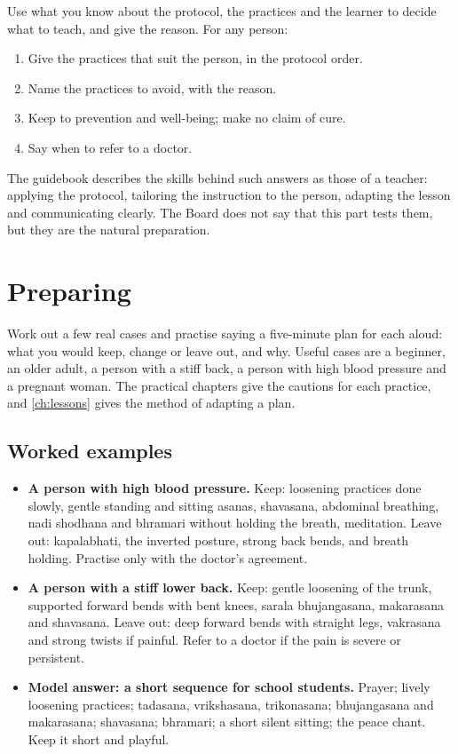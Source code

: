 Use what you know about the protocol, the practices and the learner to decide what to teach, and give the reason. For any person:
\begin{enumerate}
\item Give the practices that suit the person, in the protocol order.
\item Name the practices to avoid, with the reason.
\item Keep to prevention and well-being; make no claim of cure.
\item Say when to refer to a doctor.
\end{enumerate}
The guidebook describes the skills behind such answers as those of a teacher: applying the protocol, tailoring the instruction to the person, adapting the lesson and communicating clearly. The Board does not say that this part tests them, but they are the natural preparation.


\section{Preparing}

Work out a few real cases and practise saying a five-minute plan for each aloud: what you would keep, change or leave out, and why. Useful cases are a beginner, an older adult, a person with a stiff back, a person with high blood pressure and a pregnant woman. The practical chapters give the cautions for each practice, and \cref{ch:lessons} gives the method of adapting a plan.

\subsection*{Worked examples}
\begin{itemize}
\item \textbf{A person with high blood pressure.} Keep: loosening practices done slowly, gentle standing and sitting asanas, shavasana, abdominal breathing, nadi shodhana and bhramari without holding the breath, meditation. Leave out: kapalabhati, the inverted posture, strong back bends, and breath holding. Practise only with the doctor's agreement.
\item \textbf{A person with a stiff lower back.} Keep: gentle loosening of the trunk, supported forward bends with bent knees, sarala bhujangasana, makarasana and shavasana. Leave out: deep forward bends with straight legs, vakrasana and strong twists if painful. Refer to a doctor if the pain is severe or persistent.
\item \textbf{Model answer: a short sequence for school students.} Prayer; lively loosening practices; tadasana, vrikshasana, trikonasana; bhujangasana and makarasana; shavasana; bhramari; a short silent sitting; the peace chant. Keep it short and playful.
\end{itemize}

